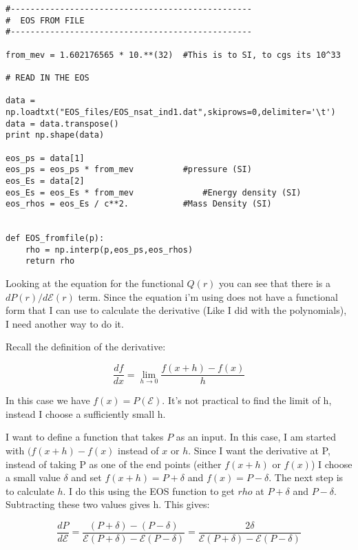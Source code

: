 \documentclass[11pt]{article}
\numberwithin{equation}{section}
\begin{document}
\begin{lstlisting}
#-------------------------------------------------
#  EOS FROM FILE
#-------------------------------------------------

from_mev = 1.602176565 * 10.**(32)  #This is to SI, to cgs its 10^33 

# READ IN THE EOS 

data = np.loadtxt("EOS_files/EOS_nsat_ind1.dat",skiprows=0,delimiter='\t')
data = data.transpose()
print np.shape(data)

eos_ps = data[1]      
eos_ps = eos_ps * from_mev      	#pressure (SI)
eos_Es = data[2]    
eos_Es = eos_Es * from_mev          	#Energy density (SI)
eos_rhos = eos_Es / c**2.			#Mass Density (SI)


def EOS_fromfile(p):
    rho = np.interp(p,eos_ps,eos_rhos)
    return rho
\end{lstlisting}


Looking at the equation for the functional $Q(r)$ you can see that there is a $dP(r)/d\mathcal{E}(r)$ term.  Since the equation i'm using does not have a functional form that I can use to calculate the derivative (Like I did with the polynomials), I need another way to do it.  

Recall the definition of the derivative:

\begin{equation}
\frac{df}{dx} = \lim_{h \to 0} \frac{f(x+h)-f(x)}{h}
\end{equation}

In this case we have $f(x) = P(\mathcal{E})$.  It's not practical to find the limit of h, instead I choose a sufficiently small h.

I want to define a function that takes $P$ as an input.  In this case, I am started with $(f(x+h)-f(x)$ instead of $x$ or $h$. Since I want the derivative at P, instead of taking P as one of the end points (either $f(x+h)$ or $f(x)$) I choose a small value $\delta$ and set $f(x+h) = P + \delta$ and $f(x) = P - \delta$.  The next step is to calculate $h$.  I do this using the EOS function to get $rho$ at $P+\delta$ and $P-\delta$.  Subtracting these two values gives h.  This gives:

\begin{equation}
\frac{dP}{d\mathcal{E}} = \frac{(P+\delta) - (P- \delta)}{\mathcal{E}(P+\delta)-\mathcal{E}(P-\delta)}  = \frac{2 \delta}{\mathcal{E}(P+\delta)-\mathcal{E}(P-\delta)}
\end{equation}
\end{document}
